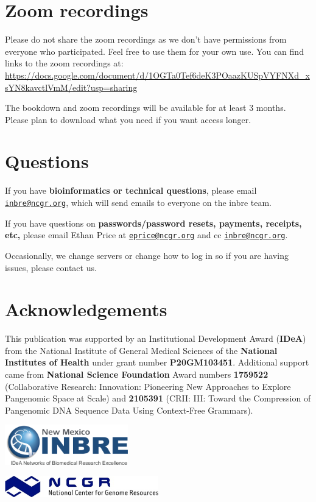 \documentclass[
]{book}
\begin{document}
\hypertarget{zoom-recordings}{%
\chapter*{Zoom recordings}\label{zoom-recordings}}

Please do not share the zoom recordings as we don't have permissions from everyone who participated. Feel free to use them for your own use.
You can find links to the zoom recordings at: \url{https://docs.google.com/document/d/1OGTa0Tef6deK3POaazKUSpVYFNXd_xsYN8kavctlVmM/edit?usp=sharing}

The bookdown and zoom recordings will be available for at least 3 months. Please plan to download what you need if you want access longer.

\hypertarget{questions}{%
\chapter*{Questions}\label{questions}}

If you have \textbf{bioinformatics or technical questions}, please email \href{mailto:inbre@ncgr.org}{\nolinkurl{inbre@ncgr.org}}, which will send emails to everyone on the inbre team.

If you have questions on \textbf{passwords/password resets, payments, receipts, etc,} please email Ethan Price at \href{mailto:eprice@ncgr.org}{\nolinkurl{eprice@ncgr.org}} and cc \href{mailto:inbre@ncgr.org}{\nolinkurl{inbre@ncgr.org}}.

Occasionally, we change servers or change how to log in so if you are having issues, please contact us.

\hypertarget{acknowledgements}{%
\chapter*{Acknowledgements}\label{acknowledgements}}

This publication was supported by an Institutional Development Award (\textbf{IDeA}) from the National Institute of General Medical Sciences of the \textbf{National Institutes of Health} under grant number \textbf{P20GM103451}. Additional support came from \textbf{National Science Foundation} Award numbers \textbf{1759522} (Collaborative Research: Innovation: Pioneering New Approaches to Explore Pangenomic Space at Scale) and \textbf{2105391} (CRII: III: Toward the Compression of Pangenomic DNA Sequence Data Using Context-Free Grammars).

\includegraphics[width=0.4\textwidth,height=\textheight]{./Figures/INBRE_Logo_Grad_transparent-2019.png}

\includegraphics[width=0.5\textwidth,height=\textheight]{./Figures/ncgr.png}

  
\end{document}

